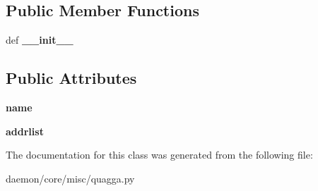 \subsection*{Public Member Functions}
\begin{DoxyCompactItemize}
\item 
\hypertarget{classcore_1_1misc_1_1quagga_1_1_net_if_aaabd4ee76b7d9f381c834d9cc777a1cd}{def {\bfseries \+\_\+\+\_\+init\+\_\+\+\_\+}}\label{classcore_1_1misc_1_1quagga_1_1_net_if_aaabd4ee76b7d9f381c834d9cc777a1cd}

\end{DoxyCompactItemize}
\subsection*{Public Attributes}
\begin{DoxyCompactItemize}
\item 
\hypertarget{classcore_1_1misc_1_1quagga_1_1_net_if_a5649ff4c9687e8e716581131eb49710f}{{\bfseries name}}\label{classcore_1_1misc_1_1quagga_1_1_net_if_a5649ff4c9687e8e716581131eb49710f}

\item 
\hypertarget{classcore_1_1misc_1_1quagga_1_1_net_if_ab8712d88c6e3580856f46b1dfc66ecfe}{{\bfseries addrlist}}\label{classcore_1_1misc_1_1quagga_1_1_net_if_ab8712d88c6e3580856f46b1dfc66ecfe}

\end{DoxyCompactItemize}


The documentation for this class was generated from the following file\+:\begin{DoxyCompactItemize}
\item 
daemon/core/misc/quagga.\+py\end{DoxyCompactItemize}
